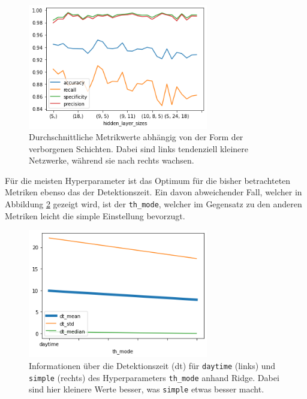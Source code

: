 \begin{figure}
    \centering
    \includegraphics[width=0.7\textwidth]{res/res-mlp-layers}
    \caption{Durchschnittliche Metrikwerte abhängig von der Form der verborgenen Schichten.
        Dabei sind links tendenziell kleinere Netzwerke, während sie nach rechts wachsen.}
    \label{fig:res-mlp-layers}
\end{figure}


Für die meisten Hyperparameter ist das Optimum für die bisher betrachteten Metriken ebenso das der
 Detektionszeit. Ein davon abweichender Fall, welcher in Abbildung \ref{fig:res-fe-th-mode} gezeigt wird, ist der
 \texttt{th\_mode}, welcher im Gegensatz zu den anderen Metriken leicht die simple Einstellung bevorzugt.

\begin{figure}
    \centering
    \includegraphics[width=0.7\textwidth]{res/res-fe-th-mode}
    \caption{Informationen über die Detektionszeit (dt) für \texttt{daytime} (links) und
        \texttt{simple} (rechts) des Hyperparameters \texttt{th\_mode} anhand Ridge.
        Dabei sind hier kleinere Werte besser, was \texttt{simple} etwas besser macht.}
    \label{fig:res-fe-th-mode}
\end{figure}

